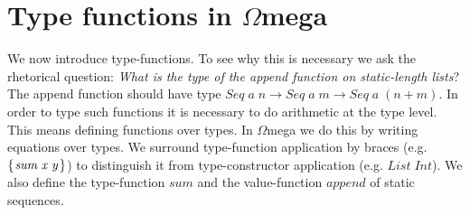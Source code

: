 \documentclass[10pt]{article}
\newcommand{\Conid}[1]{\mathit{#1}}
\newcommand{\Varid}[1]{\mathit{#1}}
\newcommand{\Wmega}{\ensuremath{\Omega}mega}
\begin{document}
\section{Type functions in \Wmega}\label{typefun}

We now introduce type-functions. To see why this is necessary
we ask the rhetorical question: {\em What is the type of the append
function on static-length lists}? The append function should have type
\ensuremath{\Conid{Seq}\;\Varid{a}\;\Varid{n}\to \Conid{Seq}\;\Varid{a}\;\Varid{m}\to \Conid{Seq}\;\Varid{a}\;(\Varid{n}\mathbin{+}\Varid{m})}. In
order to type such functions it is necessary to do arithmetic at
the type level. This means defining functions over types. In \Wmega{}
we do this by writing equations over types. We surround type-function
application by braces (e.g. \ensuremath{\{\mskip1.5mu \Varid{sum}\;\Varid{x}\;\Varid{y}\mskip1.5mu\}}) to distinguish
it from type-constructor application (e.g. \ensuremath{\Conid{List}\;\Conid{Int}}). We also define
the type-function \ensuremath{\Varid{sum}} and the value-function \ensuremath{\Varid{append}} of static sequences.\\
\end{document}
